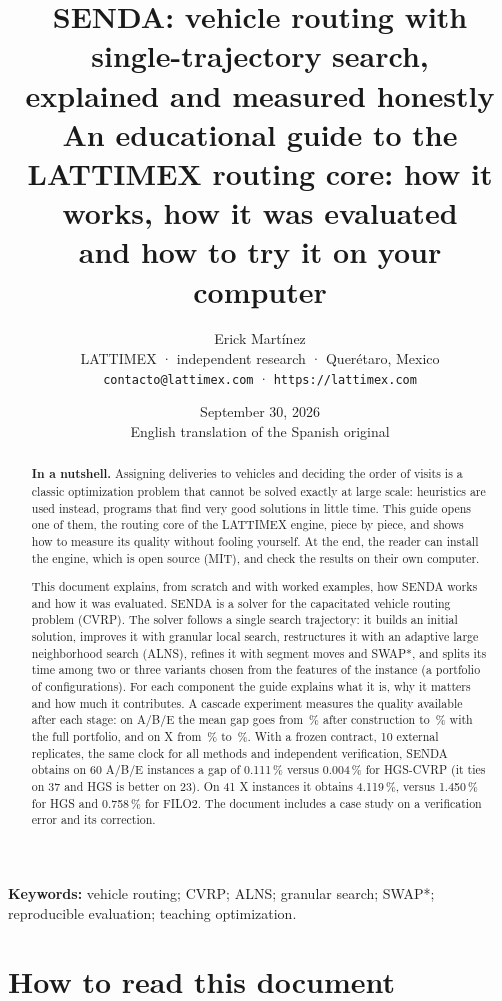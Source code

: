 \documentclass[11pt,a4paper]{article}
\title{\textbf{SENDA: vehicle routing with single-trajectory search,\\ explained and measured honestly}\\[0.4em]
\large An educational guide to the LATTIMEX routing core: how it works, how it was evaluated\\ and how to try it on your computer}
\author{Erick Martínez\\
\small LATTIMEX · independent research · Querétaro, Mexico\\
\small \texttt{contacto@lattimex.com} · \texttt{https://lattimex.com}}
\date{September 30, 2026\\[0.3em]\small English translation of the Spanish original}
\newcommand{\senda}{SENDA}
\begin{document}
\maketitle
\thispagestyle{licenciaguia}

\begin{abstract}
\noindent\textbf{In a nutshell.} Assigning deliveries to vehicles and deciding the order of visits is
a classic optimization problem that cannot be solved exactly at large scale: heuristics are used
instead, programs that find very good solutions in little time. This guide opens one of them, the
routing core of the LATTIMEX engine, piece by piece, and shows how to measure its quality without
fooling yourself. At the end, the reader can install the engine, which is open source (MIT), and
check the results on their own computer.

\smallskip
\noindent This document explains, from scratch and with worked examples, how \senda{} works and how it
was evaluated. \senda{} is a solver for the capacitated vehicle routing problem (CVRP). The solver
follows a single search trajectory: it builds an initial solution, improves it with granular local
search, restructures it with an adaptive large neighborhood search (ALNS), refines it with segment
moves and SWAP*, and splits its time among two or three variants chosen from the features of the
instance (a portfolio of configurations). For each component the guide explains what it is, why it
matters and how much it contributes. A cascade experiment measures the quality available after each
stage: on A/B/E the mean gap goes from \cgABEa\,\% after construction to \cgABEf\,\% with the full
portfolio, and on X from \cgXa\,\% to \cgXf\,\%. With a frozen contract, 10 external replicates, the
same clock for all methods and independent verification, \senda{} obtains on 60 A/B/E instances a gap
of 0.111\,\% versus 0.004\,\% for HGS-CVRP (it ties on 37 and HGS is better on 23). On 41 X instances
it obtains 4.119\,\%, versus 1.450\,\% for HGS and 0.758\,\% for FILO2. The document includes a case
study on a verification error and its correction.
\end{abstract}

\noindent\textbf{Keywords:} vehicle routing; CVRP; ALNS; granular search; SWAP*;
reproducible evaluation; teaching optimization.

\tableofcontents
\newpage

\section*{How to read this document}
\end{document}
